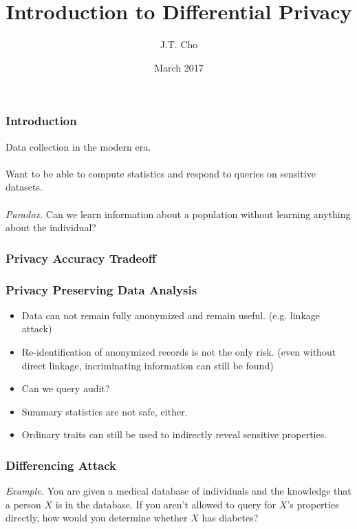 \documentclass[aspectratio=169]{beamer}
\title{Introduction to Differential Privacy}
\author{J.T. Cho}
\institute{CIS700-003 | University of Pennsylvania}
\date{March 2017}
\begin{document}
\begin{frame}
\titlepage
\end{frame}

\begin{frame}
\frametitle{Introduction}

Data collection in the modern era.\\~\\

Want to be able to compute statistics and respond to queries on sensitive datasets.\\~\\

\emph{Paradox.} Can we learn information about a population without learning anything about the individual?
\end{frame}

\begin{frame}
\frametitle{Privacy Accuracy Tradeoff}
\begin{center}
\end{center}
\end{frame}

\begin{frame}
\frametitle{Privacy Preserving Data Analysis}

\begin{itemize}
  \item Data can not remain fully anonymized and remain useful. (e.g. linkage attack)
  \item Re-identification of anonymized records is not the only risk. (even without direct linkage, incriminating information can still be found)
  \item Can we query audit?
  \item Summary statistics are not safe, either.
  \item Ordinary traits can still be used to indirectly reveal sensitive properties.
\end{itemize}
\end{frame}

\begin{frame}
\frametitle{Differencing Attack}

\emph{Example.} You are given a medical database of individuals and the knowledge that a person $X$ is in the database. If you aren't allowed to query for $X$'s properties directly, how would you determine whether $X$ has diabetes?
\end{frame}
\end{document}
